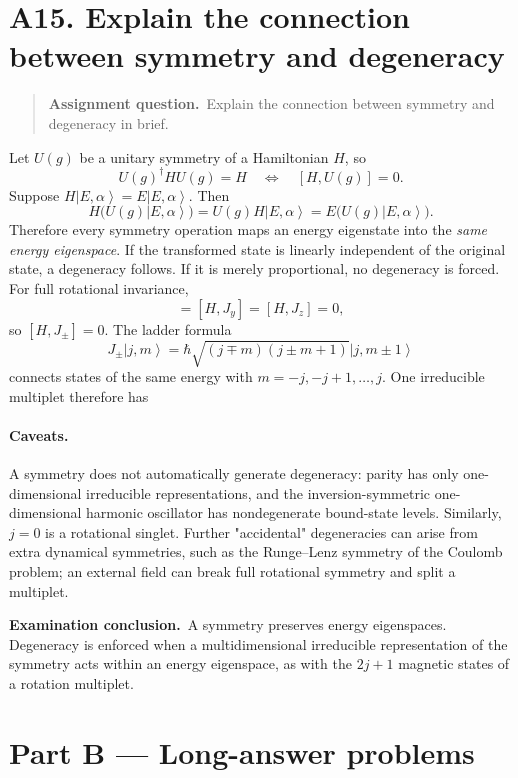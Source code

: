 \documentclass[11pt,a4paper]{article}
\theoremstyle{definition}
\newcommand{\ket}[1]{\left|#1\right\rangle}
\newcommand{\result}[1]{\begin{center}\fcolorbox{light}{white}{\begin{minipage}{0.88\textwidth}\centering\vspace{2pt}\(\displaystyle #1\)\vspace{2pt}\end{minipage}}\end{center}}
\newenvironment{question}{\begin{quote}\small\noindent\textbf{Assignment question.}\ }{\end{quote}}
\newcommand{\exam}[1]{\par\medskip\noindent\textbf{Examination conclusion.}\ #1\par}
\begin{document}
\section{A15. Explain the connection between symmetry and degeneracy}
\begin{question}Explain the connection between symmetry and degeneracy in brief.\end{question}
Let $U(g)$ be a unitary symmetry of a Hamiltonian $H$, so
\begin{equation}
U(g)^\dagger HU(g)=H\quad\Longleftrightarrow\quad[H,U(g)]=0.
\end{equation}
Suppose $H\ket{E,\alpha}=E\ket{E,\alpha}$. Then
\begin{equation}
H\bigl(U(g)\ket{E,\alpha}\bigr)
=U(g)H\ket{E,\alpha}
=E\bigl(U(g)\ket{E,\alpha}\bigr).
\end{equation}
Therefore every symmetry operation maps an energy eigenstate into the \emph{same energy eigenspace}. If the transformed state is linearly independent of the original state, a degeneracy follows. If it is merely proportional, no degeneracy is forced.
For full rotational invariance,
\begin{equation}
[H,J_x]=[H,J_y]=[H,J_z]=0,
\end{equation}
so $[H,J_\pm]=0$. The ladder formula
\begin{equation}
J_\pm\ket{j,m}=\hbar\sqrt{(j\mp m)(j\pm m+1)}\ket{j,m\pm1}
\end{equation}
connects states of the same energy with $m=-j,-j+1,\ldots,j$. One irreducible multiplet therefore has
\result{g_j=2j+1.}
\paragraph{Caveats.} A symmetry does not automatically generate degeneracy: parity has only one-dimensional irreducible representations, and the inversion-symmetric one-dimensional harmonic oscillator has nondegenerate bound-state levels. Similarly, $j=0$ is a rotational singlet. Further "accidental" degeneracies can arise from extra dynamical symmetries, such as the Runge--Lenz symmetry of the Coulomb problem; an external field can break full rotational symmetry and split a multiplet.
\exam{A symmetry preserves energy eigenspaces. Degeneracy is enforced when a multidimensional irreducible representation of the symmetry acts within an energy eigenspace, as with the $2j+1$ magnetic states of a rotation multiplet.}

\clearpage
\section*{Part B --- Long-answer problems}
\end{document}
